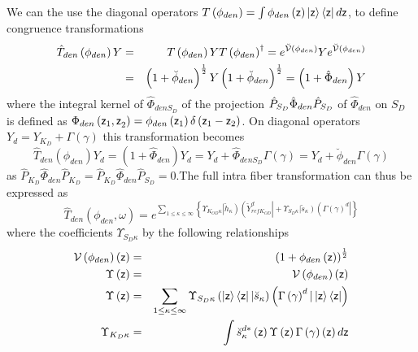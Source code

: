 We can the use the diagonal operators $T\left( \phi _{den}\right) =\int \phi
_{den}\left( {\sf z}\right) \left| {\sf z}\right\rangle \left\langle {\sf z}%
\right| d{\sf z}$, to define congruence transformations%
\begin{eqnarray}
\hat{T}_{den}\left( \phi _{den}\right) Y &=&T\left( \phi _{den}\right)
YT\left( \phi _{den}\right) ^{\dagger }=e^{{\cal \breve{V}}\left( \phi
_{den}\right) }Ye^{{\cal \breve{V}}\left( \phi _{den}\right) }  \nonumber \\
&=&\left( 1+\breve{\phi}_{den}\right) ^{\frac{1}{2}}Y\left( 1+\breve{\phi}%
_{den}\right) ^{\frac{1}{2}}=\left( 1+\hat{\Phi}_{den}\right) Y
\end{eqnarray}%
where the integral kernel of $\hat{\Phi}_{denS_{D}}$ of the projection $\hat{%
P}_{S_{D}}\hat{\Phi}_{den}\hat{P}_{S_{D}}$ of $\hat{\Phi}_{den}$ on $S_{D}$
is defined as $\Phi _{den}\left( {\sf z}_{1}{\sf ,z}_{2}\right) =\phi
_{den}\left( {\sf z}_{1}\right) \delta \left( {\sf z}_{1}-{\sf z}_{2}\right) 
$. On diagonal operators $Y_{d}=Y_{K_{D}}+\Gamma \left( \gamma \right) $
this transformation becomes 
\begin{equation}
\hat{T}_{den}\left( \phi _{den}\right) Y_{d}=\left( 1+\hat{\Phi}%
_{den}\right) Y_{d}=Y_{d}+\hat{\Phi}_{denS_{D}}\Gamma \left( \gamma \right)
=Y_{d}+\breve{\phi}_{den}\Gamma \left( \gamma \right)
\end{equation}%
as $\hat{P}_{K_{D}}\hat{\Phi}_{den}\hat{P}_{K_{D}}=\hat{P}_{K_{D}}\hat{\Phi}%
_{den}\hat{P}_{S_{D}}=0.$The full intra fiber transformation can thus be
expressed as 
\begin{equation}
\hat{T}_{den}\left( \phi _{den},\omega \right) =e^{\sum_{1\leq \kappa \leq
\infty }\left\{ \Upsilon _{K_{OD}\kappa }\left| \breve{h}_{\kappa }\right)
\left( \breve{Y}_{refK_{OD}}^{d}\right| +\Upsilon _{S_{D}\kappa }\left| 
\breve{s}_{\kappa }\right) \left( \Gamma \left( \gamma \right) ^{d}\right|
\right\} }  \label{refden}
\end{equation}%
where the coefficients $\Upsilon _{S_{D}\kappa }$ by the following
relationships%
\begin{eqnarray}
{\cal V}\left( \phi _{den}\right) \left( {\sf z}\right) &=&\left( 1+\phi
_{den}\left( {\sf z}\right) \right) ^{\frac{1}{2}}  \nonumber \\
\Upsilon \left( {\sf z}\right) &=&{\cal V}\left( \phi _{den}\right) \left( 
{\sf z}\right)  \nonumber \\
\Upsilon \left( {\sf z}\right) &=&\sum_{1\leq \kappa \leq \infty }\Upsilon
_{S_{D}\kappa }\left( \left| {\sf z}\right\rangle \left\langle {\sf z}%
\right| |\breve{s}_{\kappa }\right) \left( \Gamma \left( \gamma \right)
^{d}|\left| {\sf z}\right\rangle \left\langle {\sf z}\right| \right) 
\nonumber \\
\Upsilon _{K_{D}\kappa } &=&\int \breve{s}_{\kappa }^{d\ast }\left( {\sf z}%
\right) \Upsilon \left( {\sf z}\right) \Gamma \left( \gamma \right) \left( 
{\sf z}\right) d{\sf z}
\end{eqnarray}%
